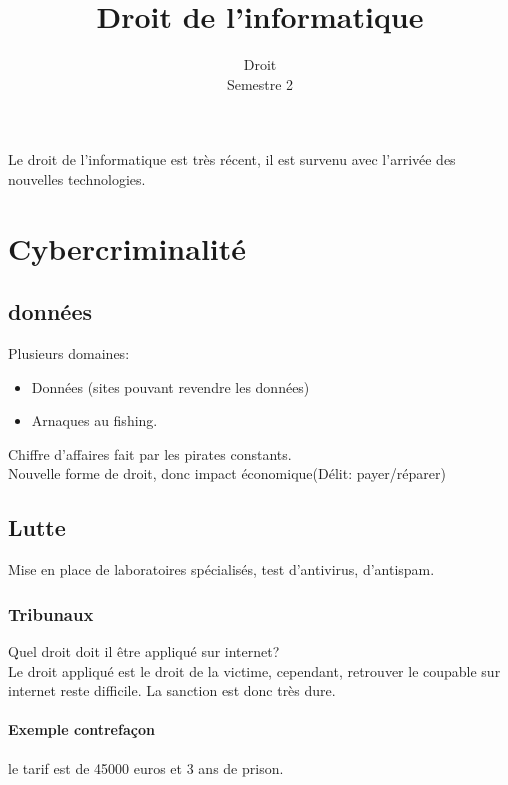 \documentclass{article}
\title{Droit de l'informatique}
\date{Droit\\ Semestre 2}
\begin{document}
	\maketitle
	Le droit de l'informatique est très récent, il est survenu avec l'arrivée
	des nouvelles technologies.\\
	\section{Cybercriminalité}
		\subsection{données}
		Plusieurs domaines:
		\begin{itemize}
			\item Données (sites pouvant revendre les données)
			\item Arnaques au fishing.
		\end{itemize}
		Chiffre d'affaires fait par les pirates constants.\\
		Nouvelle forme de droit, donc impact économique(Délit: payer/réparer)
		\subsection{Lutte}
			Mise en place de laboratoires spécialisés, test d'antivirus, 
			d'antispam.
			\subsubsection{Tribunaux}
				Quel droit doit il être appliqué sur internet? \\
				Le droit appliqué est le droit de la victime, 
				cependant, retrouver le coupable sur internet reste difficile.
				La sanction est donc très dure. 
				\paragraph{Exemple contrefaçon} le tarif est de 45000 euros et 3 ans 
				de prison.
\end{document}
